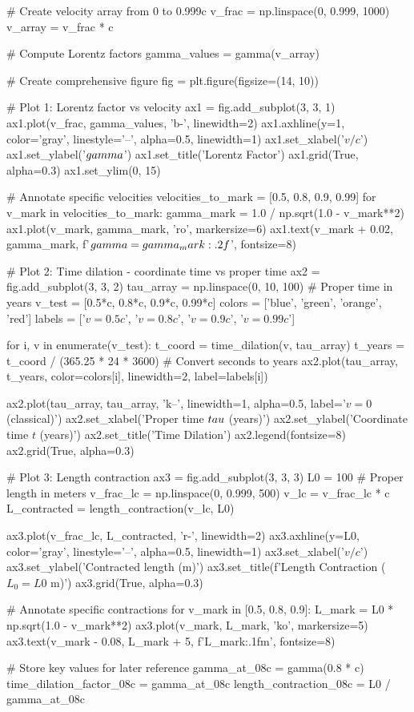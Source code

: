 \documentclass[a4paper, 11pt]{article}
\begin{document}
\begin{pycode}
# Create velocity array from 0 to 0.999c
v_frac = np.linspace(0, 0.999, 1000)
v_array = v_frac * c

# Compute Lorentz factors
gamma_values = gamma(v_array)

# Create comprehensive figure
fig = plt.figure(figsize=(14, 10))

# Plot 1: Lorentz factor vs velocity
ax1 = fig.add_subplot(3, 3, 1)
ax1.plot(v_frac, gamma_values, 'b-', linewidth=2)
ax1.axhline(y=1, color='gray', linestyle='--', alpha=0.5, linewidth=1)
ax1.set_xlabel('$v/c$')
ax1.set_ylabel('$\\gamma$')
ax1.set_title('Lorentz Factor')
ax1.grid(True, alpha=0.3)
ax1.set_ylim(0, 15)

# Annotate specific velocities
velocities_to_mark = [0.5, 0.8, 0.9, 0.99]
for v_mark in velocities_to_mark:
    gamma_mark = 1.0 / np.sqrt(1.0 - v_mark**2)
    ax1.plot(v_mark, gamma_mark, 'ro', markersize=6)
    ax1.text(v_mark + 0.02, gamma_mark, f'$\\gamma={gamma_mark:.2f}$', fontsize=8)

# Plot 2: Time dilation - coordinate time vs proper time
ax2 = fig.add_subplot(3, 3, 2)
tau_array = np.linspace(0, 10, 100)  # Proper time in years
v_test = [0.5*c, 0.8*c, 0.9*c, 0.99*c]
colors = ['blue', 'green', 'orange', 'red']
labels = ['$v=0.5c$', '$v=0.8c$', '$v=0.9c$', '$v=0.99c$']

for i, v in enumerate(v_test):
    t_coord = time_dilation(v, tau_array)
    t_years = t_coord / (365.25 * 24 * 3600)  # Convert seconds to years
    ax2.plot(tau_array, t_years, color=colors[i], linewidth=2, label=labels[i])

ax2.plot(tau_array, tau_array, 'k--', linewidth=1, alpha=0.5, label='$v=0$ (classical)')
ax2.set_xlabel('Proper time $\\tau$ (years)')
ax2.set_ylabel('Coordinate time $t$ (years)')
ax2.set_title('Time Dilation')
ax2.legend(fontsize=8)
ax2.grid(True, alpha=0.3)

# Plot 3: Length contraction
ax3 = fig.add_subplot(3, 3, 3)
L0 = 100  # Proper length in meters
v_frac_lc = np.linspace(0, 0.999, 500)
v_lc = v_frac_lc * c
L_contracted = length_contraction(v_lc, L0)

ax3.plot(v_frac_lc, L_contracted, 'r-', linewidth=2)
ax3.axhline(y=L0, color='gray', linestyle='--', alpha=0.5, linewidth=1)
ax3.set_xlabel('$v/c$')
ax3.set_ylabel('Contracted length (m)')
ax3.set_title(f'Length Contraction ($L_0={L0}$ m)')
ax3.grid(True, alpha=0.3)

# Annotate specific contractions
for v_mark in [0.5, 0.8, 0.9]:
    L_mark = L0 * np.sqrt(1.0 - v_mark**2)
    ax3.plot(v_mark, L_mark, 'ko', markersize=5)
    ax3.text(v_mark - 0.08, L_mark + 5, f'{L_mark:.1f}m', fontsize=8)

# Store key values for later reference
gamma_at_08c = gamma(0.8 * c)
time_dilation_factor_08c = gamma_at_08c
length_contraction_08c = L0 / gamma_at_08c
\end{pycode}
\end{document}
